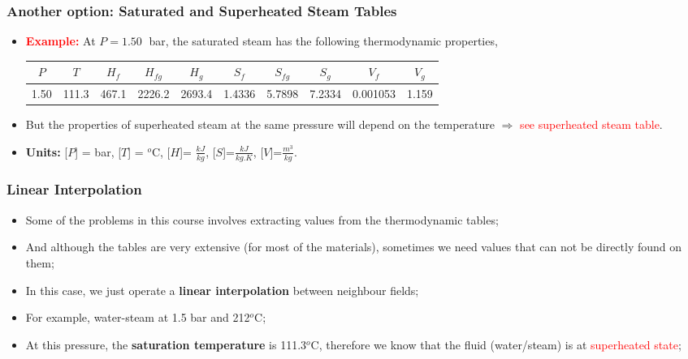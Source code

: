 \documentclass[10pt,compress]{beamer}
\begin{document}
\begin{frame}
  \frametitle{Another option: Saturated and Superheated Steam Tables}
\noindent
\begin{itemize}
\item <2-> {\bf \textcolor{red}{Example:}} At $P=1.50\;$ bar, the saturated steam has the following thermodynamic properties,
\tiny
\begin{center}
\begin{tabular}{||c|c|c c c|c c c|c c||} 
\hline\hline
$P$ & $T$ & $H_{f}$ &  $H_{fg}$ & $H_{g}$ & $S_{f}$ &  $S_{fg}$ &  $S_{g}$ & $V_{f}$ & $V_{g}$ \\ 
\hline
1.50 & 111.3 & 467.1 & 2226.2 & 2693.4 & 1.4336 & 5.7898 & 7.2334 & 0.001053 & 1.159 \\
\hline
\end{tabular}
\end{center}

\item <3-> But the properties of superheated steam at the same pressure will depend on the temperature $\Rightarrow$ \textcolor{red}{see superheated steam table}.

\item <2-> {\bf Units:} [$P$] = bar, [$T$] = $^{o}$C, [$H$]= $\frac{kJ}{kg}$, [$S$]=$\frac{kJ}{kg.K}$, [$V$]=$\frac{m^{3}}{kg}$.

\end{itemize}

\end{frame}

\begin{frame}
  \frametitle{Linear Interpolation}
\noindent
\begin{itemize}
\item <2-> Some of the problems in this course involves extracting values from the thermodynamic tables;
\item <3-> And although the tables are very extensive (for most of the materials), sometimes we need values that can not be directly found on them;
\item <4-> In this case, we just operate a {\bf linear interpolation} between neighbour fields;
\item <5-> For example, water-steam at 1.5 bar and 212$^{o}$C;
\item <6-> At this pressure, the {\bf saturation temperature} is 111.3$^{o}$C, therefore we know that the fluid (water/steam) is at \textcolor{red}{superheated state};
\end{itemize}

\end{frame}
\end{document}
